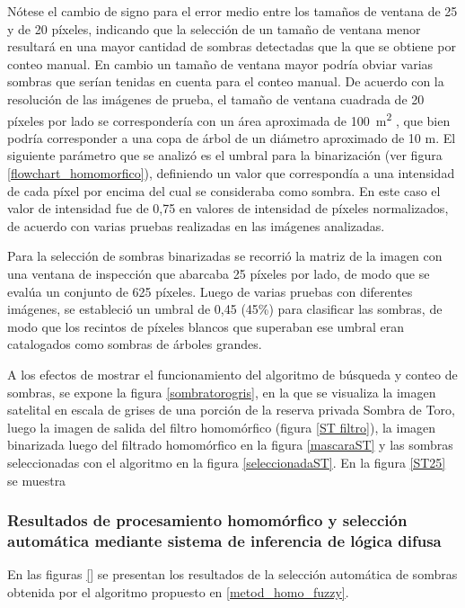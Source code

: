 Nótese el cambio de signo para el error medio entre los tamaños de ventana de 25 y de 20 píxeles, indicando que la selección de un tamaño de ventana menor resultará en una mayor cantidad de sombras detectadas que la que se obtiene por conteo manual. En cambio un tamaño de ventana mayor podría obviar varias sombras que serían tenidas en cuenta para el conteo manual. De acuerdo con la resolución de las imágenes de prueba, el tamaño de ventana cuadrada de 20 píxeles por lado se correspondería con un área aproximada de \SI{100}{\metre\squared} , que bien podría corresponder a una copa de árbol de un diámetro aproximado de 10 m.
El siguiente parámetro que se analizó es el umbral para la binarización (ver figura \ref{flowchart_homomorfico}), definiendo un valor que correspondía a una intensidad de cada píxel por encima del cual se consideraba como sombra. En este caso el valor de intensidad fue de 0,75 en valores de intensidad de píxeles normalizados, de acuerdo con varias pruebas realizadas en las imágenes analizadas.

Para la selección de sombras binarizadas se recorrió la matriz de la imagen con una ventana de inspección que abarcaba 25 píxeles por lado, de modo que se evalúa un conjunto de 625 píxeles. Luego de varias pruebas con diferentes imágenes, se estableció un umbral de 0,45 (45\%) para clasificar las sombras, de modo que los recintos de píxeles blancos que superaban ese umbral eran catalogados como sombras de árboles grandes.

A los efectos de mostrar el funcionamiento del algoritmo de búsqueda y conteo de sombras, se expone la figura \ref{sombratorogris}, en la que se visualiza la imagen satelital en escala de grises de una porción de la reserva privada Sombra de Toro, luego la imagen de salida del filtro homomórfico (figura \ref{ST filtro}), la imagen binarizada luego del filtrado homomórfico en la figura \ref{mascaraST} y las sombras seleccionadas con el algoritmo en la figura \ref{seleccionadaST}. En la figura \ref{ST25} se muestra


\subsubsection{Resultados de procesamiento homomórfico y selección automática mediante sistema de inferencia de lógica difusa} \label{resultados homo difusa}
En las figuras \ref{} se presentan los resultados de la selección automática de sombras obtenida por el algoritmo propuesto en \ref{metod_homo_fuzzy}.

